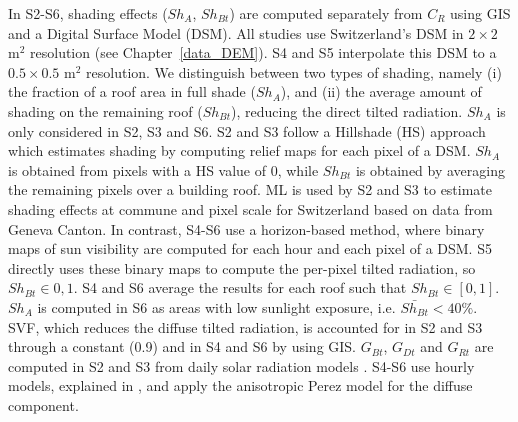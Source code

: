 In S2-S6, shading effects ($Sh_A$, $Sh_{Bt}$) are computed separately from $C_R$ using GIS and a Digital Surface Model (DSM). All studies use Switzerland’s DSM in $2 \times 2$ m$^2$ resolution (see Chapter~\ref{data_DEM}). S4 and S5 interpolate this DSM to a $0.5 \times 0.5$ m$^2$ resolution. We distinguish between two types of shading, namely (i) the fraction of a roof area in full shade ($Sh_A$), and (ii) the average amount of shading on the remaining roof ($Sh_{Bt}$), reducing the direct tilted radiation. $Sh_A$ is only considered in S2, S3 and S6. S2 and S3 follow a Hillshade (HS) approach which estimates shading by computing relief maps for each pixel of a DSM. $Sh_A$ is obtained from pixels with a HS value of 0, while $Sh_{Bt}$ is obtained by averaging the remaining pixels over a building roof. ML is used by S2 and S3 to estimate shading effects at commune and pixel scale for Switzerland based on data from Geneva Canton. In contrast, S4-S6 use a horizon-based method, where binary maps of sun visibility are computed for each hour and each pixel of a DSM. S5 directly uses these binary maps to compute the per-pixel tilted radiation, so $Sh_{Bt} \in {0, 1}$. S4 and S6 average the results for each roof such that $Sh_{Bt} \in [0, 1]$. $Sh_A$ is computed in S6 as areas with low sunlight exposure, i.e. $\bar{Sh_{Bt}} < 40\%$. SVF, which reduces the diffuse tilted radiation, is accounted for in S2 and S3 through a constant (0.9) and in S4 and S6 by using GIS. $G_{Bt}$, $G_{Dt}$ and $G_{Rt}$ are computed in S2 and S3 from daily solar radiation models \cite{assouline_quantifying_2017, assouline_large-scale_2018}. S4-S6 use hourly models, explained in \cite{perez_modeling_1990}, and apply the anisotropic Perez model for the diffuse component.


